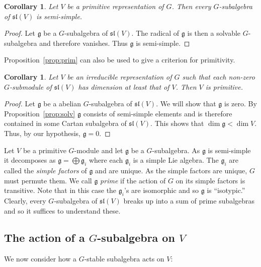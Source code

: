 \documentclass{amsart}
\newtheorem{corollary}[theorem]{Corollary}
\theoremstyle{definition}
\theoremstyle{remark}
\let\mf\mathfrak
\begin{document}
\begin{corollary}
\label{cor:prim-ss}
Let $V$ be a primitive representation of $G$.  Then every $G$-subalgebra of
$\mf{sl}(V)$ is semi-simple.
\end{corollary}

\begin{proof}
Let $\mf{g}$ be a $G$-subalgebra of $\mf{sl}(V)$.  The radical of
$\mf{g}$ is then a solvable $G$-subalgebra and therefore vanishes.
Thus $\mf{g}$ is semi-simple.
\end{proof}

Proposition~\ref{prop:prim} can also be used to give a criterion for
primitivity.

\begin{corollary}
\label{cor:prim-test}
Let $V$ be an irreducible representation of $G$ such that each non-zero
$G$-submodule of $\mf{sl}(V)$ has dimension at least that of $V$.  Then $V$
is primitive.
\end{corollary}

\begin{proof}
Let $\mf{g}$ be a abelian $G$-subalgebra of $\mf{sl}(V)$.  We will show
that $\mf{g}$ is zero.  By Proposition~\ref{prop:solv} $\mf{g}$ consists of
semi-simple elements and is therefore contained in some Cartan subalgebra of
$\mf{sl}(V)$.  This shows that $\dim{\mf{g}} < \dim{V}$.  Thus, by our
hypothesis, $\mf{g}=0$.
\end{proof}

Let $V$ be a primitive $G$-module and let $\mf{g}$ be a $G$-subalgebra.
As $\mf{g}$ is semi-simple it decomposes as $\mf{g}=\bigoplus \mf{g}_i$ where
each $\mf{g}_i$ is a simple Lie algebra.  The $\mf{g}_i$ are called the
\emph{simple factors} of $\mf{g}$ and are unique.  As the simple factors are
unique, $G$ must permute them.  We call $\mf{g}$ \emph{prime} if the action of
$G$ on its simple factors is transitive.  Note that in this case the
$\mf{g}_i$'s are isomorphic and so $\mf{g}$ is ``isotypic.''  Clearly, every
$G$-subalgebra of $\mf{sl}(V)$ breaks up into a sum of prime subalgebras and
so it suffices to understand these.


\subsection{The action of a $G$-subalgebra on $V$}

We now consider how a $G$-stable subalgebra acts on $V$:
\end{document}
